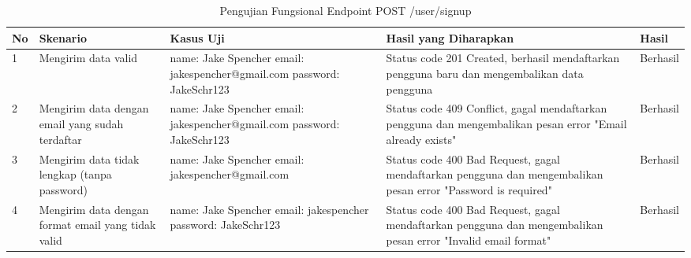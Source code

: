 \begin{table}[H]
    \centering
    \begin{tabular}{|p{0.5cm}|p{3cm}|p{5cm}|p{5cm}|p{1.5cm}|}
        \hline
        \rowcolor[HTML]{DAE8FC} 
        \textbf{No} & \textbf{Skenario} & \textbf{Kasus Uji} & \textbf{Hasil yang Diharapkan} & \textbf{Hasil} \\ \hline
        1 & Mengirim data valid & 
        name: Jake Spencher \newline 
        email: jakespencher@gmail.com \newline 
        password: JakeSchr123 & 
        Status code 201 Created, berhasil mendaftarkan pengguna baru dan mengembalikan data pengguna & 
        Berhasil \\ \hline
        2 & Mengirim data dengan email yang sudah terdaftar & 
        name: Jake Spencher \newline 
        email: jakespencher@gmail.com \newline 
        password: JakeSchr123 & 
        Status code 409 Conflict, gagal mendaftarkan pengguna dan mengembalikan pesan error "Email already exists" & 
        Berhasil \\ \hline
        3 & Mengirim data tidak lengkap (tanpa password) & 
        name: Jake Spencher \newline 
        email: jakespencher@gmail.com & 
        Status code 400 Bad Request, gagal mendaftarkan pengguna dan mengembalikan pesan error "Password is required" & 
        Berhasil \\ \hline
        4 & Mengirim data dengan format email yang tidak valid & 
        name: Jake Spencher \newline 
        email: jakespencher \newline 
        password: JakeSchr123 & 
        Status code 400 Bad Request, gagal mendaftarkan pengguna dan mengembalikan pesan error "Invalid email format" & 
        Berhasil \\ \hline
    \end{tabular}
    \caption{Pengujian Fungsional Endpoint POST /user/signup}
    \label{tab:user_signup_testing}
\end{table}
